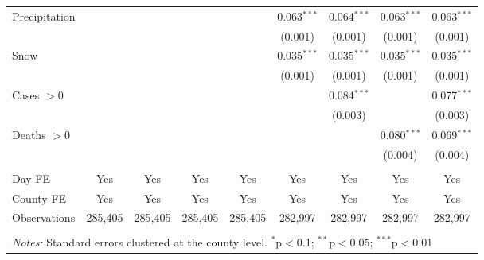 \begin{tabular}{@{\extracolsep{5pt}}lcccccccc}
  Precipitation &  &  &  &  & 0.063$^{***}$ & 0.064$^{***}$ & 0.063$^{***}$ & 0.063$^{***}$ \\ 
  &  &  &  &  & (0.001) & (0.001) & (0.001) & (0.001) \\ 
  Snow &  &  &  &  & 0.035$^{***}$ & 0.035$^{***}$ & 0.035$^{***}$ & 0.035$^{***}$ \\ 
  &  &  &  &  & (0.001) & (0.001) & (0.001) & (0.001) \\ 
  Cases $>0$ &  &  &  &  &  & 0.084$^{***}$ &  & 0.077$^{***}$ \\ 
  &  &  &  &  &  & (0.003) &  & (0.003) \\ 
  Deaths $>0$ &  &  &  &  &  &  & 0.080$^{***}$ & 0.069$^{***}$ \\ 
  &  &  &  &  &  &  & (0.004) & (0.004) \\ 
 \hline \\[-1.8ex] 
Day FE & Yes & Yes & Yes & Yes & Yes & Yes & Yes & Yes \\ 
County FE & Yes & Yes & Yes & Yes & Yes & Yes & Yes & Yes \\ 
Observations & 285,405 & 285,405 & 285,405 & 285,405 & 282,997 & 282,997 & 282,997 & 282,997 \\ 
\hline 
\hline \\[-1.8ex] 
\multicolumn{9}{l}{\textit{Notes:} Standard errors clustered at the county level. $^{*}$p$<$0.1; $^{**}$p$<$0.05; $^{***}$p$<$0.01} \\ 
\end{tabular} 
